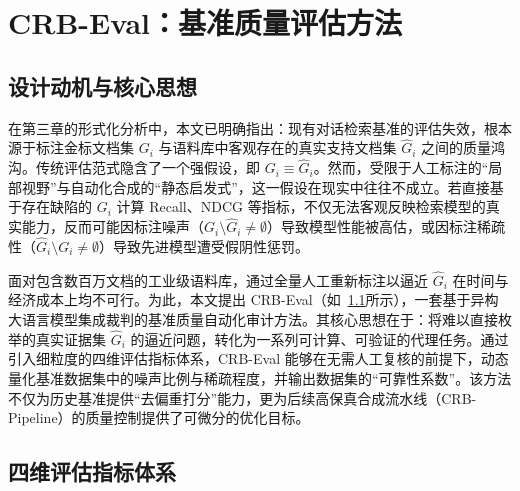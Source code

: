 \chapter{CRB-Eval：基准质量评估方法}

\label{chap:method2}



\section{设计动机与核心思想}

在第三章的形式化分析中，本文已明确指出：现有对话检索基准的评估失效，根本源于标注金标文档集 $G_i$ 与语料库中客观存在的真实支持文档集 $\hat{G}_i$ 之间的质量鸿沟。传统评估范式隐含了一个强假设，即 $G_i \equiv \hat{G}_i$。然而，受限于人工标注的“局部视野”与自动化合成的“静态启发式”，这一假设在现实中往往不成立。若直接基于存在缺陷的 $G_i$ 计算 Recall、NDCG 等指标，不仅无法客观反映检索模型的真实能力，反而可能因标注噪声（$G_i \setminus \hat{G}_i \neq \emptyset$）导致模型性能被高估，或因标注稀疏性（$\hat{G}_i \setminus G_i \neq \emptyset$）导致先进模型遭受假阴性惩罚。



面对包含数百万文档的工业级语料库，通过全量人工重新标注以逼近 $\hat{G}_i$ 在时间与经济成本上均不可行。为此，本文提出 CRB-Eval（如~\ref{fig:crb-eval-framework}所示），一套基于异构大语言模型集成裁判的基准质量自动化审计方法。其核心思想在于：将难以直接枚举的真实证据集 $\hat{G}_i$ 的逼近问题，转化为一系列可计算、可验证的代理任务。通过引入细粒度的四维评估指标体系，CRB-Eval 能够在无需人工复核的前提下，动态量化基准数据集中的噪声比例与稀疏程度，并输出数据集的“可靠性系数”。该方法不仅为历史基准提供“去偏重打分”能力，更为后续高保真合成流水线（CRB-Pipeline）的质量控制提供了可微分的优化目标。



\begin{figure}[h]

    \centering


    \label{fig:crb-eval-framework}

\end{figure}


\section{四维评估指标体系}



